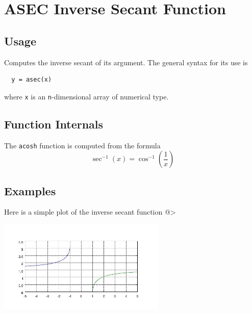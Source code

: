 \section{ASEC Inverse Secant Function}

\subsection{Usage}

Computes the inverse secant of its argument.  The general
syntax for its use is
\begin{verbatim}
  y = asec(x)
\end{verbatim}
where \verb|x| is an \verb|n|-dimensional array of numerical type.
\subsection{Function Internals}

The \verb|acosh| function is computed from the formula
\[
   \sec^{-1}(x) = \cos^{-1}\left(\frac{1}{x}\right)
\]
\subsection{Examples}

Here is a simple plot of the inverse secant function
@>


\centerline{\includegraphics[width=8cm]{asecplot}}

